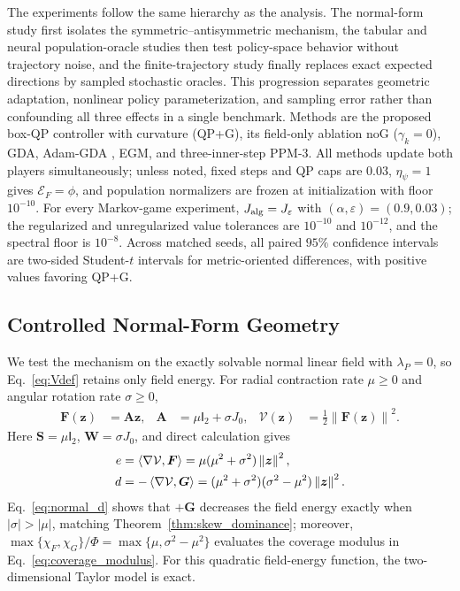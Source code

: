 \documentclass{article}
\theoremstyle{remark}
\newcommand{\inner}[2]{\left\langle #1,#2\right\rangle}
\newcommand{\norm}[1]{\left\lVert #1\right\rVert}
\newcommand{\Id}{\mathsf{I}}
\newcommand{\bz}{\boldsymbol{z}}
\newcommand{\bW}{\boldsymbol{W}}
\newcommand{\bS}{\boldsymbol{S}}
\newcommand{\bA}{\boldsymbol{A}}
\newcommand{\bF}{\boldsymbol{F}}
\newcommand{\bG}{\boldsymbol{G}}
\newcommand{\Vk}{\mathcal{V}}
\newcommand{\cE}{\mathcal{E}}
\begin{document}
The experiments follow the same hierarchy as the analysis.
The normal-form study first isolates the symmetric--antisymmetric mechanism, the tabular and neural population-oracle studies then test policy-space behavior without trajectory noise, and the finite-trajectory study finally replaces exact expected directions by sampled stochastic oracles.
This progression separates geometric adaptation, nonlinear policy parameterization, and sampling error rather than confounding all three effects in a single benchmark.
Methods are the proposed box-QP controller with curvature (QP+G), its field-only ablation noG ($\gamma_k=0$), GDA, Adam-GDA \cite{KingmaBa2015Adam}, EGM, and three-inner-step PPM-3.
All methods update both players simultaneously; unless noted, fixed steps and QP caps are $0.03$, $\eta_\psi=1$ gives $\cE_F=\phi$, and population normalizers are frozen at initialization with floor $10^{-10}$.
For every Markov-game experiment, $J_{\rm alg}=J_\varepsilon$ with $(\alpha,\varepsilon)=(0.9,0.03)$; the regularized and unregularized value tolerances are $10^{-10}$ and $10^{-12}$, and the spectral floor is $10^{-8}$.
Across matched seeds, all paired $95\%$ confidence intervals are two-sided Student-$t$ intervals for metric-oriented differences, with positive values favoring QP+G.

\subsection{Controlled Normal-Form Geometry}\label{subsec:controlled_geometry}
We test the mechanism on the exactly solvable normal linear field with $\lambda_P=0$, so Eq.~\eqref{eq:Vdef} retains only field energy.
For radial contraction rate $\mu\ge0$ and angular rotation rate $\sigma\ge0$,
\begin{align*}
\bF(\bz)&=\bA\bz,
&\bA&=\mu\Id_2+\sigma J_0,
&\Vk(\bz)&=\tfrac12\norm{\bF(\bz)}^2.
\end{align*}
Here $\bS=\mu\Id_2$, $\bW=\sigma J_0$, and direct calculation gives
\begin{align}
e&=\inner{\nabla\Vk}{\bF}
=\mu(\mu^2+\sigma^2)\norm{\bz}^2,\notag\\
d&=-\inner{\nabla\Vk}{\bG}
=(\mu^2+\sigma^2)(\sigma^2-\mu^2)\norm{\bz}^2.\label{eq:normal_d}
\end{align}
Eq.~\eqref{eq:normal_d} shows that $+\bG$ decreases the field energy exactly when $|\sigma|>|\mu|$, matching Theorem~\ref{thm:skew_dominance}; moreover, $\max\{\chi_F,\chi_G\}/\Phi=\max\{\mu,\sigma^2-\mu^2\}$ evaluates the coverage modulus in Eq.~\eqref{eq:coverage_modulus}.
For this quadratic field-energy function, the two-dimensional Taylor model is exact.
\end{document}
